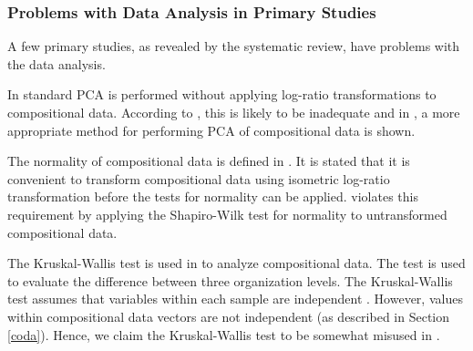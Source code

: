\subsubsection{\label{codaProblems}Problems with Data Analysis in Primary Studies}

A few primary studies, as revealed by the systematic review, have problems with the data analysis.

In \citep{Wohlin2006,Pettersson2008} standard PCA is performed without applying log-ratio transformations to compositional data. According to \citep{Aitchison1983}, this is likely to be inadequate and in \citep{Filzmoser2007}, a more appropriate method for performing PCA of compositional data is shown.

The normality of compositional data is defined in \citep{PawlowskyGlahn2007}. It is stated that it is convenient to transform compositional data using isometric log-ratio transformation before the tests for normality can be applied. \citep{Jonsson2005a} violates this requirement by applying the Shapiro-Wilk test for normality to untransformed compositional data.

The Kruskal-Wallis test is used in \citep{Jonsson2005a} to analyze compositional data. The test is used to evaluate the difference between three organization levels. The Kruskal-Wallis test assumes that variables within each sample are independent \citep{Kruskal1952a}. However, values within compositional data vectors are not independent (as described in Section \ref{coda}). Hence, we claim the Kruskal-Wallis test to be somewhat misused in \citep{Jonsson2005a}.